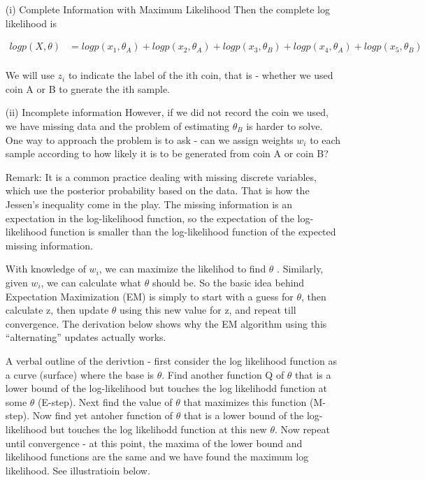 \documentclass[11pt]{article} %
\begin{document}
\begin{itemize}

\item[(i)] Complete Information with Maximum Likelihood 
Then the complete log likelihood is

\begin{align*}
	log p(X, \theta) &= log p(x_1, \theta_A) + log p(x_2, \theta_A) + log p(x_3, \theta_B) + log p(x_4, \theta_A) + log p(x_5, \theta_B)  \\
\end{align*}

We will use $z_i$ to indicate the label of the ith coin, that is - whether we used coin A or B to gnerate the ith sample.

\item[(ii)] Incomplete information
However, if we did not record the coin we used, we have missing data and the problem of estimating $\theta_B$ is harder to solve. One way to approach the problem is to ask - can we assign weights $w_i$ to each sample according to how likely it is to be generated from coin A or coin B?

Remark: 
It is a common practice dealing with missing discrete variables, which use the posterior probability based on the data. That is how the Jessen's inequality come in the play. The missing information is an expectation in the log-likelihood function, so the expectation of the log-likelihood function is smaller than the log-likelihood function of the expected missing information.


With knowledge of $w_i$, we can maximize the likelihod to find $\theta$ . Similarly, given $w_i$, we can calculate what $\theta$ should be. So the basic idea behind Expectation Maximization (EM) is simply to start with a guess for $\theta$, then calculate z, then update $\theta$ using this new value for z, and repeat till convergence. The derivation below shows why the EM algorithm using this “alternating” updates actually works.

A verbal outline of the derivtion - first consider the log likelihood function as a curve (surface) where the base is $\theta$. Find another function Q
 of $\theta$ that is a lower bound of the log-likelihood but touches the log likelihodd function at some $\theta$ (E-step). Next find the value of $\theta$ that maximizes this function (M-step). Now find yet antoher function of $\theta$ that is a lower bound of the log-likelihood but touches the log likelihodd function at this new $\theta$. Now repeat until convergence - at this point, the maxima of the lower bound and likelihood functions are the same and we have found the maximum log likelihood. See illustratioin below.



\end{itemize}
\end{document}
